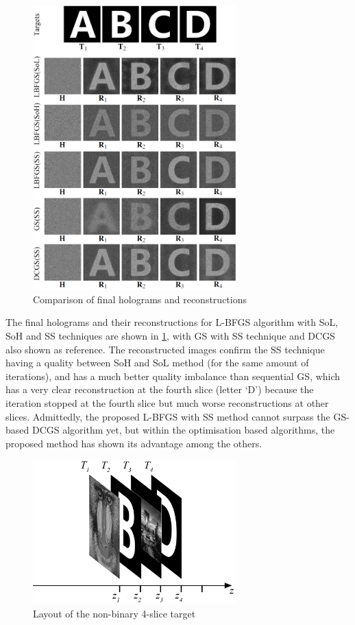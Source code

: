 \begin{figure}[H]
	\centering
	\includegraphics[width=0.7\textwidth]{final_holograms_reconstructions_4_slice}
	\caption{Comparison of final holograms and reconstructions}
	\label{fig:3D_ABCD}
\end{figure}

The final holograms and their reconstructions for L-BFGS algorithm with SoL, SoH and SS techniques are shown in \cref{fig:3D_ABCD}, with GS with SS technique and DCGS also shown as reference. The reconstructed images confirm the SS technique having a quality between SoH and SoL method (for the same amount of iterations), and has a much better quality imbalance than sequential GS, which has a very clear reconstruction at the fourth slice (letter `D') because the iteration stopped at the fourth slice but much worse reconstructions at other slices. Admittedly, the proposed L-BFGS with SS method cannot surpass the GS-based DCGS algorithm yet, but within the optimisation based algorithms, the proposed method has shown its advantage among the others.




\begin{figure}[H]
	\centering
	\includegraphics[width=0.7\textwidth]{Fresnel_slice_mandrill_B_szzx_D}
	\caption{Layout of the non-binary 4-slice target}
	\label{fig:more_difficult_3d_target_layout}
\end{figure}

